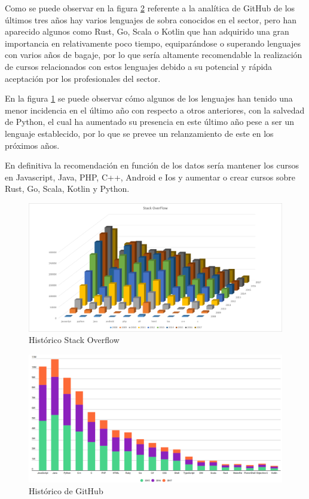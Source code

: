 Como se puede observar en la figura \ref{HistGitHub} referente a la analítica de GitHub de los últimos tres años hay varios lenguajes de sobra conocidos en el sector, pero han aparecido algunos como Rust, Go, Scala o Kotlin que han adquirido una gran importancia en relativamente poco tiempo, equiparándose o superando lenguajes con varios años de bagaje, por lo que sería altamente recomendable la realización de cursos relacionados con estos lenguajes debido a su potencial y rápida aceptación por los profesionales del sector.

En la figura \ref{HistStof} se puede observar cómo algunos de los lenguajes han tenido una menor incidencia en el último año con respecto a otros anteriores, con la salvedad de Python, el cual ha aumentado su presencia en este último año pese a ser un lenguaje establecido, por lo que se prevee un relanzamiento de este en los próximos años.

En definitiva la recomendación en función de los datos sería mantener los cursos en Javascript, Java, PHP, C++, Android e Ios y aumentar o crear cursos sobre Rust, Go, Scala, Kotlin y Python.
\begin{figure}[htp!]
	\centering
	\caption{Histórico Stack Overflow}
	\label{HistStof}
	\vspace{5pt}
	\includegraphics[scale=0.55]{graficas/stofHist}
\end{figure}
\begin{figure}[htp!]
	\centering
	\caption{Histórico de GitHub}
	\label{HistGitHub}
	\vspace{5pt}
	\includegraphics[scale=0.25]{graficas/githubBarTotal}
\end{figure}



